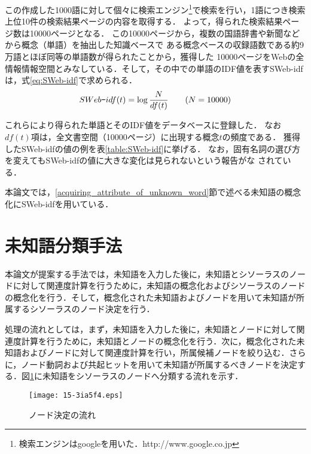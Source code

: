 \documentclass[japanese]{jnlp_1.4}
\begin{document}
この作成した1000語に対して個々に検索エンジン\footnote{検索エンジンはgoogleを用いた．http://www.google.co.jp}で検索を行い，1語につき検索上位10件の検索結果ページの内容を取得する．
よって，得られた検索結果ページ数は10000ページとなる．
この10000ページから，複数の国語辞書や新聞などから概念（単語）を抽出した知識ベースで
ある概念ベースの収録語数である約9万語とほぼ同等の単語数が得られたことから，獲得した
10000ページをWebの全情報情報空間とみなしている．そして，その中での単語のIDF値を表すSWeb-idfは，式\ref{eq:SWeb-idf}で求められる．
\begin{equation}
 SWeb \verb|-| idf(t)=\log\frac{N}{df(t)}\hspace{2em}(N=10000)
	\label{eq:SWeb-idf}
\end{equation}

これらにより得られた単語とそのIDF値をデータベースに登録した．
なお$\mathit{df}(t)$項は，全文書空間（10000ページ）に出現する概念$t$の頻度である．
獲得したSWeb-idfの値の例を表\ref{table:SWeb-idf}に挙げる．
なお，固有名詞の選び方を変えてもSWeb-idfの値に大きな変化は見られないという報告がな
されている\cite{tuji:04}．

本論文では，\ref{acquiring_attribute_of_unknown_word}節で述べる未知語の概念化にSWeb-idfを用いている．


\section{未知語分類手法}\label{node_mapping}

本論文が提案する手法では，未知語を入力した後に，未知語とシソーラスのノードに対して関連度計算を行うために，未知語の概念化およびシソーラスのノードの概念化を行う．そして，概念化された未知語およびノードを用いて未知語が所属するシソーラスのノード決定を行う．

処理の流れとしては，まず，未知語を入力した後に，未知語とノードに対して関連度計算を行うために，未知語とノードの概念化を行う．次に，概念化された未知語およびノードに対して関連度計算を行い，所属候補ノードを絞り込む．さらに，ノード動詞および共起ヒットを用いて未知語が所属するべきノードを決定する．図\ref{fig:flow_node_mapping}に未知語をシソーラスのノードへ分類する流れを示す．

\begin{figure}[b]
\begin{center}
\texttt{[image: 15-3ia5f4.eps]}
\end{center}
\caption{ノード決定の流れ}
\label{fig:flow_node_mapping}
\end{figure}
\end{document}
